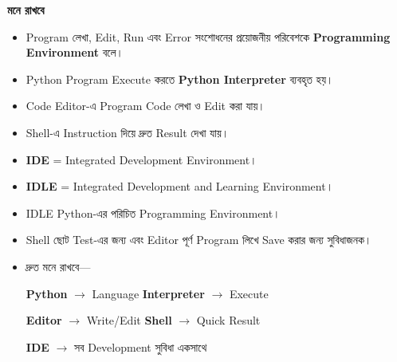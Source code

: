 
\begin{rememberbox}

\textbf{\color{deepOrange}মনে রাখবে}

\begin{itemize}

\item
Program লেখা, Edit, Run এবং Error সংশোধনের প্রয়োজনীয় পরিবেশকে
\textbf{Programming Environment} বলে।

\item
Python Program Execute করতে
\textbf{Python Interpreter}
ব্যবহৃত হয়।

\item
Code Editor-এ Program Code লেখা ও Edit করা যায়।

\item
Shell-এ Instruction দিয়ে দ্রুত Result দেখা যায়।

\item
\textbf{IDE}
=
Integrated Development Environment।

\item
\textbf{IDLE}
=
Integrated Development and Learning Environment।

\item
IDLE Python-এর পরিচিত Programming Environment।

\item
Shell ছোট Test-এর জন্য এবং Editor পূর্ণ Program লিখে
Save করার জন্য সুবিধাজনক।

\item
দ্রুত মনে রাখবে—

\begin{center}

\textbf{Python}
\(\longrightarrow\)
Language
\qquad
\textbf{Interpreter}
\(\longrightarrow\)
Execute

\medskip

\textbf{Editor}
\(\longrightarrow\)
Write/Edit
\qquad
\textbf{Shell}
\(\longrightarrow\)
Quick Result

\medskip

\textbf{IDE}
\(\longrightarrow\)
সব Development সুবিধা একসাথে

\end{center}

\end{itemize}

\end{rememberbox}

\small


